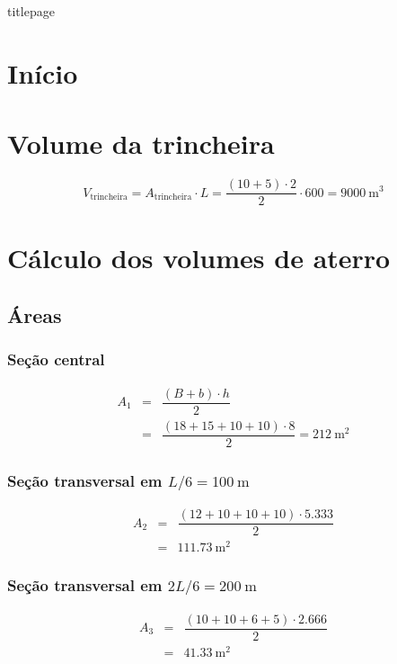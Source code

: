 \documentclass[a4paper, 12pt, brazilian]{article}
\begin{document}
	{titlepage}
	
	\section{Início}
	
	\section{Volume da trincheira}
	
	\begin{equation}
		V_{\textrm{trincheira}}=A_{\textrm{trincheira}}\cdot L=\dfrac{(10+5)\cdot 2}{2}\cdot 600=\SI{9000}{\meter^{3}}
	\end{equation}
	
	\section{Cálculo dos volumes de aterro}
	
	\subsection{Áreas}
	
	\subsubsection{Seção central}
	
	\begin{eqnarray}
		A_{1}&=&\dfrac{(B+b)\cdot h}{2}\\
		&=&\dfrac{(18+15+10+10)\cdot 8}{2}
		=\SI{212}{\meter^{2}}
	\end{eqnarray}
	
	
	\subsubsection{Seção transversal em $L/6=\SI{100}{\meter}$}
	
	\begin{eqnarray}
		A_{2}&=&\dfrac{(12+10+10+10)\cdot 5.333}{2}\\
		&=&\SI{111.73}{\meter^{2}}
	\end{eqnarray}
	
	\subsubsection{Seção transversal em $2L/6=\SI{200}{\meter}$}
	
	\begin{eqnarray}
		A_{3}&=&\dfrac{(10+10+6+5)\cdot 2.666}{2}\\
		&=&\SI{41.33}{\meter^{2}}
	\end{eqnarray}
	
\end{document}
